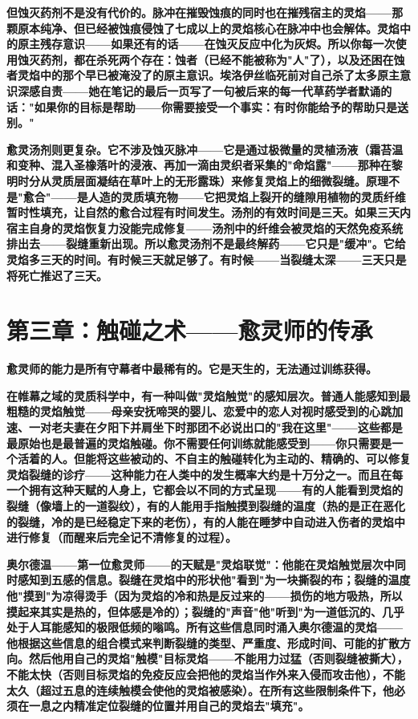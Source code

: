 \documentclass[12pt,a4paper,openany]{ctexbook}
\begin{document}
\textbf{但蚀灭药剂不是没有代价的。脉冲在摧毁蚀痕的同时也在摧残宿主的灵焰——那颗原本纯净、但已经被蚀痕侵蚀了七成以上的灵焰核心在脉冲中也会解体。灵焰中的原主残存意识——如果还有的话——在蚀灭反应中化为灰烬。所以你每一次使用蚀灭药剂，都在杀死两个存在：蚀者（已经不能被称为"人"了），以及还困在蚀者灵焰中的那个早已被淹没了的原主意识。埃洛伊丝临死前对自己杀了太多原主意识深感自责——她在笔记的最后一页写了一句被后来的每一代草药学者默诵的话："如果你的目标是帮助——你需要接受一个事实：有时你能给予的帮助只是送别。"}


\textbf{愈灵汤剂则更复杂。它不涉及蚀灭脉冲——它是通过极微量的灵植汤液（霜苔温和变种、混入圣橡落叶的浸液、再加一滴由灵织者采集的"命焰露"——那种在黎明时分从灵质层面凝结在草叶上的无形露珠）来修复灵焰上的细微裂缝。原理不是"愈合"——是人造的灵质填充物——它把灵焰上裂开的缝隙用植物的灵质纤维暂时性填充，让自然的愈合过程有时间发生。汤剂的有效时间是三天。如果三天内宿主自身的灵焰恢复力没能完成修复——汤剂中的纤维会被灵焰的天然免疫系统排出去——裂缝重新出现。所以愈灵汤剂不是最终解药——它只是"缓冲"。它给灵焰多三天的时间。有时候三天就足够了。有时候——当裂缝太深——三天只是将死亡推迟了三天。}


\section*{第三章：触碰之术——愈灵师的传承}


\textbf{愈灵师的能力是所有守幕者中最稀有的。它是天生的，无法通过训练获得。}


\textbf{在帷幕之域的灵质科学中，有一种叫做"灵焰触觉"的感知层次。普通人能感知到最粗糙的灵焰触觉——母亲安抚啼哭的婴儿、恋爱中的恋人对视时感受到的心跳加速、一对老夫妻在夕阳下并肩坐下时那团不必说出口的"我在这里"——这些都是最原始也是最普遍的灵焰触碰。你不需要任何训练就能感受到——你只需要是一个活着的人。但能将这些被动的、不自主的触碰转化为主动的、精确的、可以修复灵焰裂缝的诊疗——这种能力在人类中的发生概率大约是十万分之一。而且在每一个拥有这种天赋的人身上，它都会以不同的方式呈现——有的人能看到灵焰的裂缝（像墙上的一道裂纹），有的人能用手指触摸到裂缝的温度（热的是正在恶化的裂缝，冷的是已经稳定下来的老伤），有的人能在睡梦中自动进入伤者的灵焰中进行修复（而醒来后完全记不清修复的过程）。}


\textbf{奥尔德温——第一位愈灵师——的天赋是"灵焰联觉"：他能在灵焰触觉层次中同时感知到五感的信息。裂缝在灵焰中的形状他"看到"为一块撕裂的布；裂缝的温度他"摸到"为凉得烫手（因为灵焰的冷和热是反过来的——损伤的地方吸热，所以摸起来其实是热的，但体感是冷的）；裂缝的"声音"他"听到"为一道低沉的、几乎处于人耳能感知的极限低频的嗡鸣。所有这些信息同时涌入奥尔德温的灵焰——他根据这些信息的组合模式来判断裂缝的类型、严重度、形成时间、可能的扩散方向。然后他用自己的灵焰"触模"目标灵焰——不能用力过猛（否则裂缝被撕大），不能太快（否则目标灵焰的免疫反应会把他的灵焰当作外来入侵而攻击他），不能太久（超过五息的连续触模会使他的灵焰被感染）。在所有这些限制条件下，他必须在一息之内精准定位裂缝的位置并用自己的灵焰去"填充"。}
\end{document}
